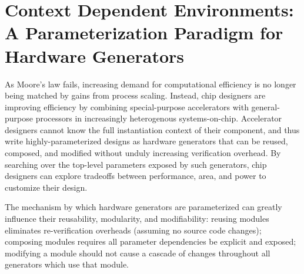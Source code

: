 \chapter{Context Dependent Environments: A Parameterization Paradigm for Hardware Generators}
\label{c.parameters}


As Moore's law fails, increasing demand for computational efficiency is no longer being matched by gains from process scaling. 
Instead, chip designers are improving efficiency by combining special-purpose accelerators with general-purpose processors in increasingly heterogenous systems-on-chip.
Accelerator designers cannot know the full instantiation context of their component, and thus write highly-parameterized designs as hardware generators that can be reused, composed, and modified without unduly increasing verification overhead.
By searching over the top-level parameters exposed by such generators, chip designers can explore tradeoffs between performance, area, and power to customize their design.

The mechanism by which hardware generators are parameterized can greatly influence their reusability, modularity, and modifiability: 
reusing modules eliminates re-verification overheads (assuming no source code changes); 
composing modules requires all parameter dependencies be explicit and exposed; 
modifying a module should not cause a cascade of changes throughout all generators which use that module.


